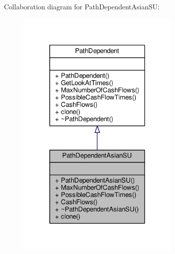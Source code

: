 Collaboration diagram for Path\+Dependent\+Asian\+SU\+:
\nopagebreak
\begin{figure}[H]
\begin{center}
\leavevmode
\includegraphics[width=225pt]{classPathDependentAsianSU__coll__graph}
\end{center}
\end{figure}
